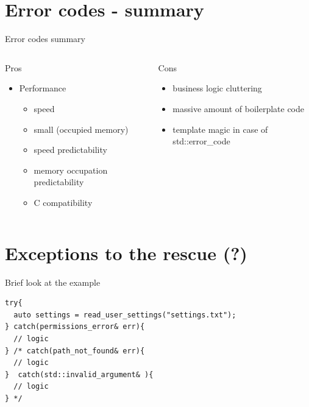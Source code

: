 \documentclass[10pt]{beamer}
\begin{document}
\section{Error codes - summary}

\begin{frame}{Error codes summary}
	\begin{columns}[T]
		\begin{column}{0.48\linewidth}
			Pros 
			\vfill
			\begin{itemize}
				\item Performance
				\begin{itemize}[<+- | alert@+>]
					\item speed
					\item small (occupied memory)
					\item speed predictability
					\item memory occupation predictability
					\item C compatibility
				\end{itemize} \pause
			\end{itemize}
		\end{column}
		\begin{column}{0.48\linewidth}
			Cons
			\vfill
			\begin{itemize}[<+- | alert@+>]
				\item business logic cluttering
				\item massive amount of boilerplate code
				\item template magic in case of std::error\_code
			\end{itemize}
		\end{column}
	\end{columns}
\end{frame}


\section{Exceptions to the rescue (?)}

\begin{frame}[fragile]{Brief look at the example}
	\begin{verbatim}
try{
  auto settings = read_user_settings("settings.txt");
} catch(permissions_error& err){
  // logic
} /* catch(path_not_found& err){
  // logic
}  catch(std::invalid_argument& ){
  // logic
} */
	\end{verbatim}
\end{frame}
\end{document}
